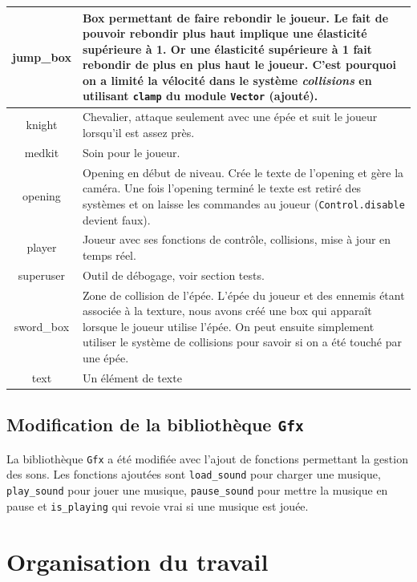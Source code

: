 \documentclass{article}
\begin{document}
\begin{center}
\begin{tabular}[h]{ |c|p{10cm}| }
        \hline
        jump\_box & Box permettant de faire rebondir le joueur. Le fait de pouvoir rebondir plus haut implique une élasticité 
        supérieure à 1. Or une élasticité supérieure à 1 fait rebondir de plus en plus haut le joueur. C'est pourquoi on a limité la 
        vélocité dans le système \textit{collisions} en utilisant \verb|clamp| du module \verb|Vector| (ajouté). \\
        \hline
        knight & Chevalier, attaque seulement avec une épée et suit le joueur lorsqu'il est assez près. \\
        \hline
        medkit & Soin pour le joueur. \\
        \hline
        opening & Opening en début de niveau. Crée le texte de l'opening et gère la caméra. Une fois l'opening terminé 
        le texte est retiré des systèmes et on laisse les commandes au joueur (\verb|Control.disable| devient faux). \\
        \hline
        player & Joueur avec ses fonctions de contrôle, collisions, mise à jour en temps réel. \\
        \hline
        superuser & Outil de débogage, voir section tests. \\
        \hline
        sword\_box & Zone de collision de l'épée. L'épée du joueur et des ennemis étant associée à la texture, nous avons 
        créé une box qui apparaît lorsque le joueur utilise l'épée. On peut ensuite simplement utiliser le système de collisions 
        pour savoir si on a été touché par une épée. \\
        \hline
        text & Un élément de texte \\
        \hline

    \end{tabular}
\end{center}

\subsection{Modification de la bibliothèque \texttt{Gfx}}
La bibliothèque \verb|Gfx| a été modifiée avec l'ajout de fonctions permettant la gestion des sons.
Les fonctions ajoutées sont \verb|load_sound| pour charger une musique, \verb|play_sound| pour jouer 
une musique, \verb|pause_sound| pour mettre la musique en pause et \verb|is_playing| qui 
revoie vrai si une musique est jouée.

\section{Organisation du travail}
\end{document}
